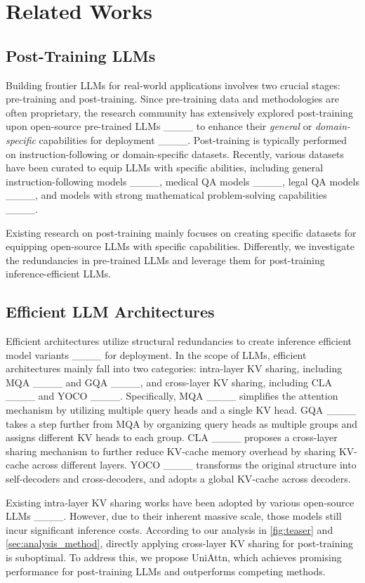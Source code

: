 \section{Related Works}
\subsection{Post-Training LLMs}

Building frontier LLMs for real-world applications involves two crucial stages: pre-training and post-training. Since pre-training data and methodologies are often proprietary, the research community has extensively explored post-training upon open-source pre-trained LLMs ____ to enhance their \textit{general} or \textit{domain-specific} capabilities for deployment ____.
Post-training is typically performed on instruction-following or domain-specific datasets.
Recently, various datasets have been curated to equip LLMs with specific abilities, including general instruction-following models ____, medical QA models ____, legal QA models ____, and models with strong mathematical problem-solving capabilities ____.

Existing research on post-training mainly focuses on creating specific datasets for equipping open-source LLMs with specific capabilities. 
Differently, we investigate the redundancies in pre-trained LLMs and leverage them for post-training inference-efficient LLMs.

\subsection{Efficient LLM Architectures}
Efficient architectures utilize structural redundancies to create inference efficient model variants ____ for deployment.
In the scope of LLMs, efficient architectures mainly fall into two categories: intra-layer KV sharing, including MQA ____ and GQA ____, and cross-layer KV sharing, including CLA ____ and YOCO ____.
Specifically, MQA ____ simplifies the attention mechanism by utilizing multiple query heads and a single KV head. 
GQA ____ takes a step further from MQA by organizing query heads as multiple groups and assigns different KV heads to each group.
CLA ____ proposes a cross-layer sharing mechanism to further reduce KV-cache memory overhead by sharing KV-cache across different layers. 
YOCO ____ transforms the original structure into self-decoders and cross-decoders, and adopts a global KV-cache across decoders.

Existing intra-layer KV sharing works have been adopted by various open-source LLMs ____. However, due to their inherent massive scale, those models still incur significant inference costs. According to our analysis in \cref{fig:teaser} and \cref{sec:analysis_method}, directly applying cross-layer KV sharing for post-training is suboptimal. To address this, we propose UniAttn, which achieves promising performance for post-training LLMs and outperforms competing methods.